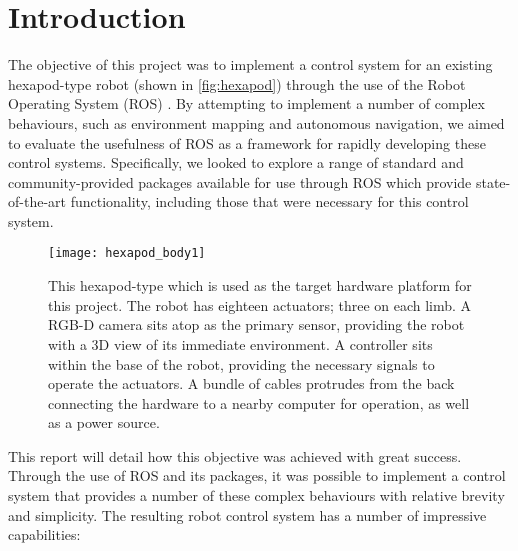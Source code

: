 \chapter{Introduction}
\label{chap:introduction}


The objective of this project was to implement a control system for an existing hexapod-type robot (shown in \autoref{fig:hexapod}) through the use of the Robot Operating System (ROS) \cite{ros_site}. By attempting to implement a number of complex behaviours, such as environment mapping and autonomous navigation, we aimed to evaluate the usefulness of ROS as a framework for rapidly developing these control systems. Specifically, we looked to explore a range of standard and community-provided packages available for use through ROS which provide state-of-the-art functionality, including those that were necessary for this control system.

\begin{figure}[t]
    \centering
    \texttt{[image: hexapod\_body1]}
    \caption{This hexapod-type which is used as the target hardware platform for this project. The robot has eighteen actuators; three on each limb. A RGB-D camera sits atop as the primary sensor, providing the robot with a 3D view of its immediate environment. A controller sits within the base of the robot, providing the necessary signals to operate the actuators. A bundle of cables protrudes from the back connecting the hardware to a nearby computer for operation, as well as a power source.}
    \label{fig:hexapod}
\end{figure}

This report will detail how this objective was achieved with great success. Through the use of ROS and its packages, it was possible to implement a control system that provides a number of these complex behaviours with relative brevity and simplicity. The resulting robot control system has a number of impressive capabilities:

